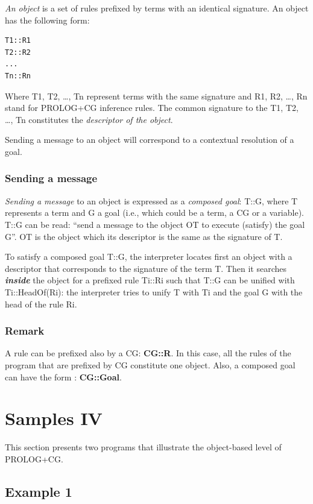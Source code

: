 \documentclass{book}
\begin{document}
{\it An object} is a set of rules prefixed by terms with an
identical signature. An object has the following form:


\begin{verbatim}
T1::R1
T2::R2
...
Tn::Rn
\end{verbatim}


Where T1, T2, \ldots{}, Tn represent terms with the same signature and
R1, R2, \ldots{}, Rn stand for PROLOG+CG inference rules. The common
signature to the T1, T2, \ldots{}, Tn constitutes the {\it descriptor
of the object}.

Sending a message to an object will correspond to a contextual
resolution of a goal.

\subsubsection{Sending a message} 

{\it Sending a message} to an object is expressed as a {\it composed
goal}: T::G, where T represents a term and G a goal (i.e., which
could be a term, a CG or a variable). T::G can be read: ``send a
message to the object OT to execute (satisfy) the goal G''.  OT is the
object which its descriptor is the same as the signature of T.

To satisfy a composed goal T::G, the interpreter locates first an
object with a descriptor that corresponds to the signature of the term
T. Then it searches {\bf {\it inside}} the object for a prefixed rule
Ti::Ri such that T::G can be unified with Ti::HeadOf(Ri): the
interpreter tries to unify T with Ti and the goal G with the head of
the rule Ri.

\subsubsection{Remark} 

A rule can be prefixed also by a CG: {\bf CG::R}. In this case, all
the rules of the program that are prefixed by CG constitute one
object. Also, a composed goal can have the form : {\bf CG::Goal}.

\section{Samples IV}\label{Sec:SamplesIV}

This section presents two programs that illustrate the object-based
level of PROLOG+CG.

\subsection{Example 1}
\end{document}
